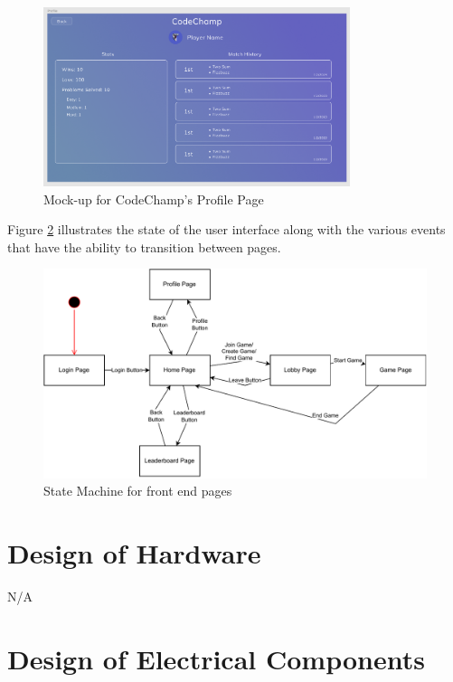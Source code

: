 \documentclass[12pt, titlepage]{article}
\begin{document}
\begin{figure}[H]
\centering
\includegraphics[width=0.8\textwidth]{Design/SystDesign/ProfilePage.png}
\caption{Mock-up for CodeChamp's Profile Page}\label{fig:ui-end}
\end{figure}

Figure \ref{fig:statemachine} illustrates the state of the user interface along with the various events that have the ability to transition between pages.

\begin{figure}[H]
\centering
\includegraphics[width=1\textwidth]{Design/SystDesign/State.pdf}
\caption{State Machine for front end pages}
\label{fig:statemachine}
\end{figure}

\section{Design of Hardware}

N/A

\section{Design of Electrical Components}
\end{document}
